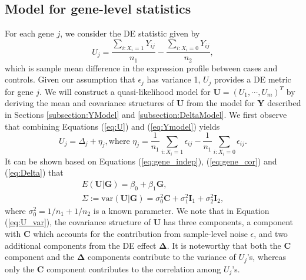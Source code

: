 \documentclass[useAMS,usenatbib, galley]{biom}
\begin{document}
	\subsection{Model for gene-level statistics}\label{subsection:UModel}
	For each gene $j$, we consider the DE statistic given by 
	\begin{equation}
		\label{eq:U}
		U_j = \dfrac{\sum_{i: X_i=1}Y_{ij}}{n_1} - \dfrac{\sum_{i: X_i=0}Y_{ij}}{n_2},
	\end{equation}
	which is sample mean difference in the expression profile between cases and controls. Given our assumption that $\epsilon_j$ has variance 1, $U_j$ provides a DE metric for gene $j$. We will construct a quasi-likelihood model for $\bm U=(U_1,\cdots,U_m)^T$ by deriving the mean and covariance structures of $\bm U$ from the model for $\bm Y$ described in Sections \ref{subsection:YModel} and \ref{subsection:DeltaModel}. We first observe that combining Equations (\ref{eq:U}) and (\ref{eq:Ymodel}) yields
	\begin{equation} 
		U_j = \Delta_j + \eta_j, \text{where } \eta_j = \dfrac{1}{n_1}\sum_{i: X_i=1}\epsilon_{ij}- \dfrac{1}{n_1}\sum_{i: X_i=0}\epsilon_{ij}.
	\end{equation}
	It can be shown based on Equations (\ref{eq:gene_indep}), (\ref{eq:gene_cor}) and (\ref{eq:Delta}) that
	\begin{gather}
		E(\bm U|\bm G) = \beta_0+\beta_1 \bm G,\label{eq:U_mean}\\
		\Sigma:=\mbox{var}(\bm U|\bm G) = \sigma_0^2\bm C + \sigma_1^2\bm I_1+\sigma_2^2\bm I_2,\label{eq:U_var}
	\end{gather}
	where $\sigma_0^2=1/n_1+1/n_2$ is a known parameter. We note that in Equation (\ref{eq:U_var}), the covariance structure of $\bm U$ has three components, a component with $\bm C$ which accounts for the contribution from sample-level noise $\epsilon$, and two additional components from the DE effect $\bm \Delta$. It is noteworthy that both the $\bm C$ component and the $\bm \Delta$ components contribute to the variance of $U_j$'s, whereas only the $\bm C$ component contributes to the correlation among $U_j$'s.
	
\end{document}
